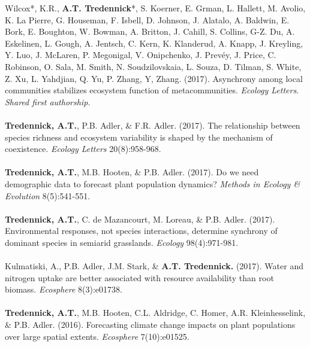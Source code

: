 

\begin{pubentries}
\begin{\small}
Wilcox*, K.R., {\bf{A.T. Tredennick}}*, S. Koerner, E. Grman, L. Hallett, M. Avolio, K. La Pierre, G. Houseman, F. Isbell, D. Johnson, J. Alatalo, A. Baldwin, E. Bork, E. Boughton, W. Bowman, A. Britton, J. Cahill, S. Collins, G-Z. Du, A. Eskelinen, L. Gough, A. Jentsch, C. Kern, K. Klanderud, A. Knapp, J. Kreyling, Y. Luo, J. McLaren, P. Megonigal, V. Onipchenko, J. Prevéy, J. Price, C. Robinson, O. Sala, M. Smith, N. Soudzilovskaia, L. Souza, D. Tilman, S. White, Z. Xu, L. Yahdjian, Q. Yu, P. Zhang, Y, Zhang. (2017). Asynchrony among local communities stabilizes ecosystem function of metacommunities. \emph{Ecology Letters}.\\
{\footnotesize*{\emph{Shared first authorship.}}}\\
\\
{\bf{Tredennick, A.T.}}, P.B. Adler, \& F.R. Adler. (2017). The relationship between species richness and ecosystem variability is shaped by the mechanism of coexistence. \emph{Ecology Letters} 20(8):958-968. \\
\\
{\bf{Tredennick, A.T.}}, M.B. Hooten, \& P.B. Adler. (2017). Do we need demographic data to forecast plant population dynamics? \emph{Methods in Ecology \& Evolution} 8(5):541-551.\\
\\
{\bf{Tredennick, A.T.}}, C. de Mazancourt, M. Loreau, \& P.B. Adler. (2017). Environmental responses, not species interactions, determine synchrony of dominant species in semiarid grasslands. \emph{Ecology} 98(4):971-981.\\
\\
Kulmatiski, A., P.B. Adler, J.M. Stark, \& {\bf{A.T. Tredennick.}} (2017). Water and nitrogen uptake are better associated with resource availability than root biomass. \emph{Ecosphere} 8(3):e01738.\\
\\
{\bf{Tredennick, A.T.}}, M.B. Hooten, C.L. Aldridge, C. Homer, A.R. Kleinhesselink, \& P.B. Adler. (2016). Forecasting climate change impacts on plant populations over large spatial extents. \emph{Ecosphere} 7(10):e01525.\\

\end{\small}
\end{pubentries}
